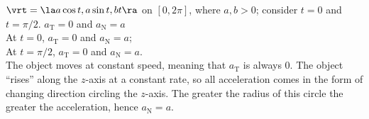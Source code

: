 {$\vrt = \la a\cos t,a\sin t, bt \ra$ on $[0,2\pi]$, where $a,b>0$; consider $t=0$ and $t=\pi/2$.
}
{$a_{\text{T}} = 0$ and $a_{\text{N}} = a$\\
At $t=0$, $a_{\text{T}} = 0$ and $a_{\text{N}} = a$;\\
At $t=\pi/2$, $a_{\text{T}} = 0$ and $a_{\text{N}} = a$.\\
The object moves at constant speed, meaning that $a_{\text{T}}$ is always 0. The object ``rises'' along the $z$-axis at a constant rate, so all acceleration comes in the form of changing direction circling the $z$-axis. The greater the radius of this circle the greater the acceleration, hence $a_{\text{N}}=a$.
}